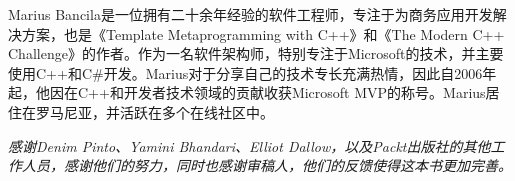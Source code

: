 \noindent
Marius Bancila是一位拥有二十余年经验的软件工程师，专注于为商务应用开发解决方案，也是《Template Metaprogramming with C++》和《The Modern C++ Challenge》的作者。作为一名软件架构师，特别专注于Microsoft的技术，并主要使用C++和C\#开发。Marius对于分享自己的技术专长充满热情，因此自2006年起，他因在C++和开发者技术领域的贡献收获Microsoft MVP的称号。Marius居住在罗马尼亚，并活跃在多个在线社区中。


\hspace*{\fill}

\begin{center}

\textit{
感谢Denim Pinto、Yamini Bhandari、Elliot Dallow，以及Packt出版社的其他工作人员，感谢他们的努力，同时也感谢审稿人，他们的反馈使得这本书更加完善。
}

\end{center}


